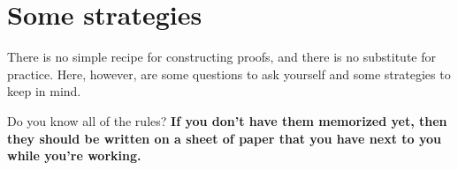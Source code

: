 {{{{{{{{{\begin{small}
\begin{earg}
\end{earg}

\end{small}












\chapter{Some strategies}
There is no simple recipe for constructing proofs, and there is no substitute for practice. Here, however, are some questions to ask yourself and some strategies to keep in mind.

\begin{earg}
\item[\ex{18-1}] Do you know all of the rules? \textbf{If you don’t have them memorized yet, then they should be written on a sheet of paper that you have next to you while you’re working.}
\medskip


\end{earg}}}}}}}}}}
